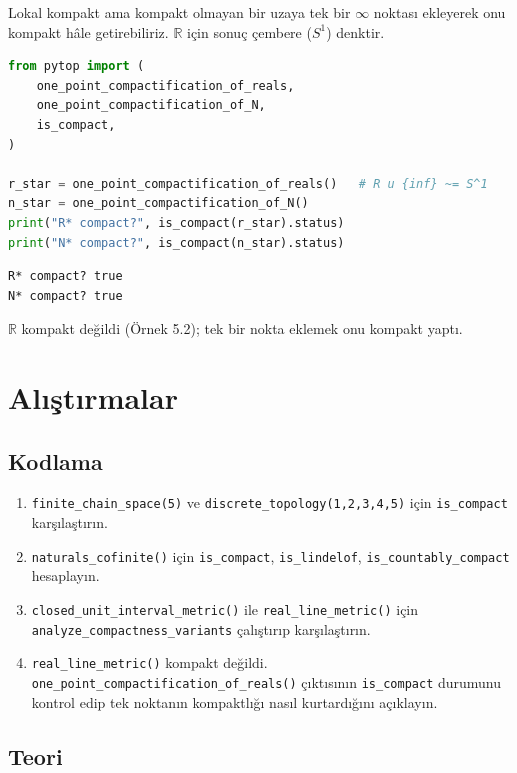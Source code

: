 Lokal kompakt ama kompakt olmayan bir uzaya tek bir $\infty$ noktası ekleyerek onu
kompakt hâle getirebiliriz. $\mathbb{R}$ için sonuç çembere ($S^1$) denktir.

\begin{lstlisting}[language=Python]
from pytop import (
    one_point_compactification_of_reals,
    one_point_compactification_of_N,
    is_compact,
)

r_star = one_point_compactification_of_reals()   # R u {inf} ~= S^1
n_star = one_point_compactification_of_N()
print("R* compact?", is_compact(r_star).status)
print("N* compact?", is_compact(n_star).status)
\end{lstlisting}

\begin{verbatim}
R* compact? true
N* compact? true
\end{verbatim}

$\mathbb{R}$ kompakt değildi (Örnek 5.2); tek bir nokta eklemek onu kompakt yaptı.

\section{Alıştırmalar}

\subsection*{Kodlama}

\begin{enumerate}[label=K\arabic*.]
\item \texttt{finite\_chain\_space(5)} ve \texttt{discrete\_topology(1,2,3,4,5)} için
      \texttt{is\_compact} karşılaştırın.
\item \texttt{naturals\_cofinite()} için \texttt{is\_compact}, \texttt{is\_lindelof},
      \texttt{is\_countably\_compact} hesaplayın.
\item \texttt{closed\_unit\_interval\_metric()} ile \texttt{real\_line\_metric()} için
      \texttt{analyze\_compactness\_variants} çalıştırıp karşılaştırın.
\item \texttt{real\_line\_metric()} kompakt değildi.
      \texttt{one\_point\_compactification\_of\_reals()} çıktısının
      \texttt{is\_compact} durumunu kontrol edip tek noktanın kompaktlığı nasıl
      kurtardığını açıklayın.
\end{enumerate}

\subsection*{Teori}

